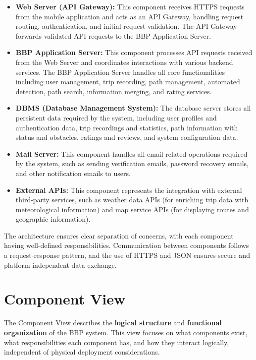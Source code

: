 \begin{itemize}
    \item \textbf{Web Server (API Gateway):} This component receives HTTPS requests from the mobile application and acts as an API Gateway, handling request routing, authentication, and initial request validation. The API Gateway forwards validated API requests to the BBP Application Server.
    
    \item \textbf{BBP Application Server:} This component processes API requests received from the Web Server and coordinates interactions with various backend services. The BBP Application Server handles all core functionalities including user management, trip recording, path management, automated detection, path search, information merging, and rating services.
    
    \item \textbf{DBMS (Database Management System):} The database server stores all persistent data required by the system, including user profiles and authentication data, trip recordings and statistics, path information with status and obstacles, ratings and reviews, and system configuration data. 
    
    \item \textbf{Mail Server:} This component handles all email-related operations required by the system, such as sending verification emails, password recovery emails, and other notification emails to users.
    
    \item \textbf{External APIs:} This component represents the integration with external third-party services, such as weather data APIs (for enriching trip data with meteorological information) and map service APIs (for displaying routes and geographic information).
\end{itemize}

The architecture ensures clear separation of concerns, with each component having well-defined responsibilities. Communication between components follows a request-response pattern, and the use of HTTPS and JSON ensures secure and platform-independent data exchange.

\section{Component View}
\label{sec:component_view}%

The Component View describes the \textbf{logical structure} and \textbf{functional organization} of the BBP system. This view focuses on what components exist, what responsibilities each component has, and how they interact logically, independent of physical deployment considerations.

